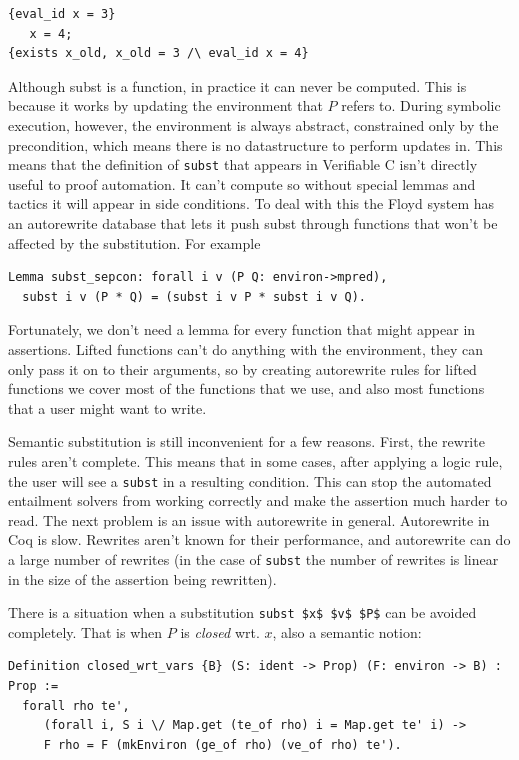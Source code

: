 \documentclass{puthesis}
\begin{document}
\begin{verbatim}
{eval_id x = 3}
   x = 4;
{exists x_old, x_old = 3 /\ eval_id x = 4}
\end{verbatim}


Although subst is a function, in practice it can never be computed.
This is because it works by updating the environment that $P$ refers
to. During symbolic execution, however, the environment is always
abstract, constrained only by the precondition, which means there is
no datastructure to perform updates in. This means that the definition of
\lstinline|subst| that appears in Verifiable C isn't directly useful
to proof automation. It can't compute so without special lemmas and
tactics it will appear in side conditions. To deal with this the Floyd
system has an autorewrite database that lets it push subst through
functions that won't be affected by the substitution. For example

\begin{verbatim}
Lemma subst_sepcon: forall i v (P Q: environ->mpred),
  subst i v (P * Q) = (subst i v P * subst i v Q).
\end{verbatim}

Fortunately, we don't need a lemma for every function that might
appear in assertions. Lifted functions can't do anything with the
environment, they can only pass it on to their arguments, so
by creating autorewrite rules for lifted functions we cover
most of the functions that we use, and also most functions
that a user might want to write. 

Semantic substitution is still inconvenient for a few reasons. First,
the rewrite rules aren't complete. This means that in some cases, after
applying a logic rule, the user will see a \lstinline|subst| in a
resulting condition. This can stop the automated entailment
solvers from working correctly and make the assertion much harder
to read. The next problem is an issue with autorewrite in general.
Autorewrite in Coq is slow. Rewrites aren't known for their 
performance, and autorewrite can do a large number of rewrites
(in the case of \lstinline|subst| the number of rewrites is
linear in the size of the assertion being rewritten). 

There is a situation when a substitution \lstinline|subst $x$ $v$ $P$| can
be avoided completely. That is when $P$ is \emph{closed} wrt. 
$x$, also a semantic notion:

\begin{verbatim}
Definition closed_wrt_vars {B} (S: ident -> Prop) (F: environ -> B) : Prop := 
  forall rho te',  
     (forall i, S i \/ Map.get (te_of rho) i = Map.get te' i) ->
     F rho = F (mkEnviron (ge_of rho) (ve_of rho) te').
\end{verbatim}
\end{document}
